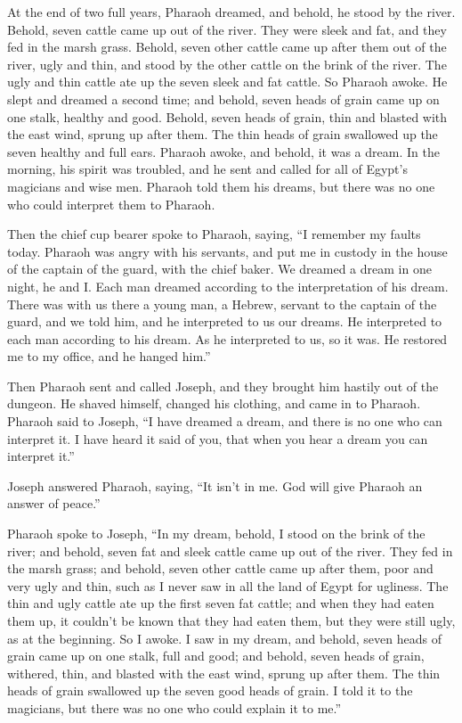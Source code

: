  At the end of two full years, Pharaoh dreamed, and
behold, he stood by the river.  Behold, seven cattle came
up out of the river. They were sleek and fat, and they fed in the marsh
grass.  Behold, seven other cattle came up after them out
of the river, ugly and thin, and stood by the other cattle on the brink
of the river.  The ugly and thin cattle ate up the seven
sleek and fat cattle. So Pharaoh awoke.  He slept and
dreamed a second time; and behold, seven heads of grain came up on one
stalk, healthy and good.  Behold, seven heads of grain,
thin and blasted with the east wind, sprung up after them.
 The thin heads of grain swallowed up the seven healthy
and full ears. Pharaoh awoke, and behold, it was a dream. 
In the morning, his spirit was troubled, and he sent and called for all
of Egypt's magicians and wise men. Pharaoh told them his dreams, but
there was no one who could interpret them to Pharaoh.

 Then the chief cup bearer spoke to Pharaoh, saying, ``I
remember my faults today.  Pharaoh was angry with his
servants, and put me in custody in the house of the captain of the
guard, with the chief baker.  We dreamed a dream in one
night, he and I. Each man dreamed according to the interpretation of his
dream.  There was with us there a young man, a Hebrew,
servant to the captain of the guard, and we told him, and he interpreted
to us our dreams. He interpreted to each man according to his dream.
 As he interpreted to us, so it was. He restored me to my
office, and he hanged him.''

 Then Pharaoh sent and called Joseph, and they brought
him hastily out of the dungeon. He shaved himself, changed his clothing,
and came in to Pharaoh.  Pharaoh said to Joseph, ``I have
dreamed a dream, and there is no one who can interpret it. I have heard
it said of you, that when you hear a dream you can interpret it.''

 Joseph answered Pharaoh, saying, ``It isn't in me. God
will give Pharaoh an answer of peace.''

 Pharaoh spoke to Joseph, ``In my dream, behold, I stood
on the brink of the river;  and behold, seven fat and
sleek cattle came up out of the river. They fed in the marsh grass;
 and behold, seven other cattle came up after them, poor
and very ugly and thin, such as I never saw in all the land of Egypt for
ugliness.  The thin and ugly cattle ate up the first
seven fat cattle;  and when they had eaten them up, it
couldn't be known that they had eaten them, but they were still ugly, as
at the beginning. So I awoke.  I saw in my dream, and
behold, seven heads of grain came up on one stalk, full and good;
 and behold, seven heads of grain, withered, thin, and
blasted with the east wind, sprung up after them.  The
thin heads of grain swallowed up the seven good heads of grain. I told
it to the magicians, but there was no one who could explain it to me.''

